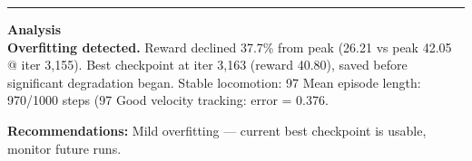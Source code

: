 \documentclass[a4paper,10pt]{article}
\begin{document}
\vspace{2pt}
\hrule
\vspace{2pt}

\footnotesize
\textbf{Analysis} \\[1pt]
\textbf{Overfitting detected.} Reward declined 37.7\% from peak (26.21 vs peak 42.05 @ iter 3,155).
Best checkpoint at iter 3,163 (reward 40.80), saved before significant degradation began.
Stable locomotion: 97%
Mean episode length: 970/1000 steps (97%
Good velocity tracking: error = 0.376.

\textbf{Recommendations:}
Mild overfitting --- current best checkpoint is usable, monitor future runs.
\end{document}
